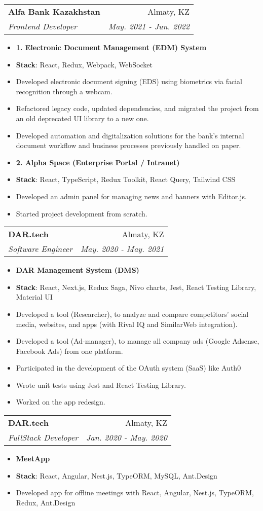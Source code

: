 \documentclass[letterpaper,11pt]{article}
\makeatletter
\newcommand{\resumeItem}[2]{
  \item\small{
    \textbf{#1}{: #2 \vspace{-2pt}}
  }
}
\newcommand{\projectName}[1]{
  \item\small{
    \textbf{#1}
  }
}
\newcommand{\listItem}[1]{
  \item\small{
    {#1}
  }
}
\newcommand{\resumeSubheading}[4]{
  \vspace{-1pt}\item
    \begin{tabular*}{0.97\textwidth}{l@{\extracolsep{\fill}}r}
      \textbf{#1} & #2 \\
      \textit{\small #3} & \textit{\small #4} \\
    \end{tabular*}\vspace{-5pt}
}
\newcommand{\resumeItemListStart}{\begin{itemize}}
\newcommand{\resumeItemListEnd}{\end{itemize}\vspace{-5pt}}
\makeatother
\begin{document}
        \resumeSubheading
          {Alfa Bank Kazakhstan}{Almaty, KZ}
          {Frontend Developer}{May. 2021 - Jun. 2022}
          \resumeItemListStart
            
    \projectName{1. Electronic Document Management (EDM) System}
    \resumeItem{Stack}{React, Redux, Webpack, WebSocket}
    \listItem{Developed electronic document signing (EDS) using biometrics via facial recognition through a webcam.} 
\listItem{Refactored legacy code, updated dependencies, and migrated the project from an old deprecated UI library to a new one.} 
\listItem{Developed automation and digitalization solutions for the bank's internal document workflow and business processes previously handled on paper.} 

  
    \projectName{2. Alpha Space (Enterprise Portal / Intranet)}
    \resumeItem{Stack}{React, TypeScript, Redux Toolkit, React Query, Tailwind CSS}
    \listItem{Developed an admin panel for managing news and banners with Editor.js.} 
\listItem{Started project development from scratch.} 

  
          \resumeItemListEnd
      
        \resumeSubheading
          {DAR.tech}{Almaty, KZ}
          {Software Engineer}{May. 2020 - May. 2021}
          \resumeItemListStart
            
    \projectName{DAR Management System (DMS)}
    \resumeItem{Stack}{React, Next.js, Redux Saga, Nivo charts, Jest, React Testing Library, Material UI}
    \listItem{Developed a tool (Researcher), to analyze and compare competitors' social media, websites, and apps (with Rival IQ and SimilarWeb integration).} 
\listItem{Developed a tool (Ad-manager), to manage all company ads (Google Adsense, Facebook Ads) from one platform.} 
\listItem{Participated in the development of the OAuth system (SaaS) like Auth0} 
\listItem{Wrote unit tests using Jest and React Testing Library.} 
\listItem{Worked on the app redesign.} 

  
          \resumeItemListEnd
      
        \resumeSubheading
          {DAR.tech}{Almaty, KZ}
          {FullStack Developer}{Jan. 2020 - May. 2020}
          \resumeItemListStart
            
    \projectName{MeetApp}
    \resumeItem{Stack}{React, Angular, Nest.js, TypeORM, MySQL, Ant.Design}
    \listItem{Developed app for offline meetings with React, Angular, Nest.js, TypeORM, Redux, Ant.Design} 

  
          \resumeItemListEnd
      
\end{document}
